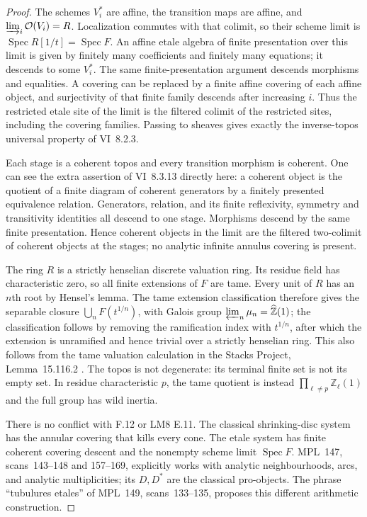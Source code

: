 \begin{proof}
The schemes $V_i^*$ are affine, the transition maps are affine, and
$\varinjlim_i\mathcal O(V_i)=R$. Localization commutes with that colimit,
so their scheme limit is $\operatorname{Spec}R[1/t]=\operatorname{Spec}F$.
An affine etale algebra of finite presentation over this limit is given
by finitely many coefficients and finitely many equations; it descends
to some $V_i^*$. The same finite-presentation argument descends morphisms
and equalities. A covering can be replaced by a finite affine covering
of each affine object, and surjectivity of that finite family descends
after increasing $i$. Thus the restricted etale site of the limit is
the filtered colimit of the restricted sites, including the covering
families. Passing to sheaves gives exactly the inverse-topos universal
property of VI~8.2.3.

Each stage is a coherent topos and every transition morphism is coherent.
One can see the extra assertion of VI~8.3.13 directly here: a coherent
object is the quotient of a finite diagram of coherent generators by a
finitely presented equivalence relation. Generators, relation, and its
finite reflexivity, symmetry and transitivity identities all descend to
one stage. Morphisms descend by the same finite presentation. Hence
coherent objects in the limit are the filtered two-colimit of coherent
objects at the stages; no analytic infinite annulus covering is present.

The ring $R$ is a strictly henselian discrete valuation ring. Its residue
field has characteristic zero, so all finite extensions of $F$ are tame.
Every unit of $R$ has an $n$th root by Hensel's lemma. The tame extension
classification therefore gives the separable closure
$\bigcup_n F(t^{1/n})$, with Galois group
$\varprojlim_n\mu_n=\widehat{\mathbb Z}(1)$; the classification follows
by removing the ramification index with $t^{1/n}$, after which the
extension is unramified and hence trivial over a strictly henselian
ring. This also follows from the tame valuation calculation in the
Stacks Project, Lemma~15.116.2 \cite{StacksTameDVR}.
The topos is not degenerate: its terminal finite set is not its empty
set. In residue characteristic $p$, the tame quotient is instead
$\prod_{\ell\ne p}\mathbb Z_\ell(1)$ and the full group has wild inertia.

There is no conflict with F.12 or LM8 E.11. The classical shrinking-disc
system has the annular covering that kills every cone. The etale system
has finite coherent covering descent and the nonempty scheme limit
$\operatorname{Spec}F$. MPL~147, scans~143--148 and 157--169, explicitly
works with analytic neighbourhoods, arcs, and analytic multiplicities;
its $D,D^*$ are the classical pro-objects. The phrase ``tubulures etales''
of MPL~149, scans~133--135, proposes this different arithmetic construction.
\end{proof}

